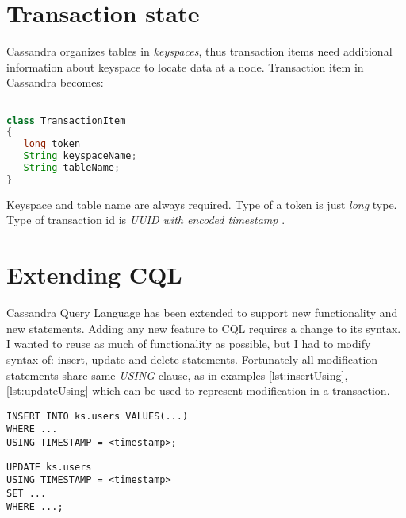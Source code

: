 \section{Transaction state}
Cassandra organizes tables in \emph{keyspaces}, thus transaction items need additional information about keyspace to locate data at a node. Transaction item in Cassandra becomes:

\begin{lstlisting}[language=Java,style=outcode,label={lst:txState},caption={Transaction item in Cassandra}]

class TransactionItem
{
   long token
   String keyspaceName;
   String tableName;
}
\end{lstlisting}

Keyspace and table name are always required. Type of a token is just \emph{long} type. Type of transaction id is \emph{UUID with encoded timestamp} \cite{CassandraUUID}.


\section{Extending CQL}
Cassandra Query Language has been extended to support new functionality and new statements. Adding any new feature to CQL requires a change to its syntax. I wanted to reuse as much of functionality as possible, but I had to modify syntax of: insert, update and delete statements. Fortunately all modification statements share same \emph{USING} clause, as in examples \ref{lst:insertUsing}, \ref{lst:updateUsing} which can be used to represent modification in a transaction.

\begin{lstlisting}[style=outcode,label={lst:insertUsing},caption={Insert statement with using clause}]
INSERT INTO ks.users VALUES(...) 
WHERE ... 
USING TIMESTAMP = <timestamp>;
\end{lstlisting}

\begin{lstlisting}[style=outcode,label={lst:updateUsing},caption={Update statement with using clause}]
UPDATE ks.users 
USING TIMESTAMP = <timestamp> 
SET ...
WHERE ...;
\end{lstlisting}


